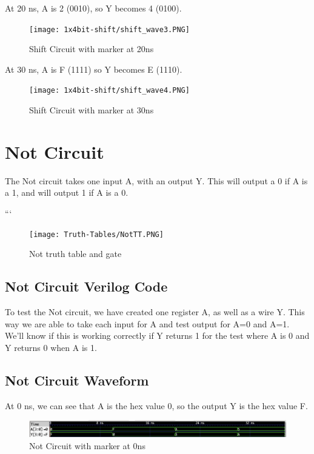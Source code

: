 \documentclass[12pt]{article}
\begin{document}
At 20 ns, A is 2 (0010), so Y becomes 4 (0100).
\begin{figure}[H]
    \centering
    \texttt{[image: 1x4bit-shift/shift\_wave3.PNG]}
    \caption{Shift Circuit with marker at 20ns}
    \label{fig:shift-wave3}
\end{figure}


At 30 ns, A is F (1111) so Y becomes E (1110).
\begin{figure}[H]
    \centering
    \texttt{[image: 1x4bit-shift/shift\_wave4.PNG]}
    \caption{Shift Circuit with marker at 30ns}
    \label{fig:shift-wave4}
\end{figure}

\section{Not Circuit}
The Not circuit takes one input A, with an output Y. This will output a 0 if A is a 1, and will output 1 if A is a 0.

```\begin{figure}[H]
    \centering
    \texttt{[image: Truth-Tables/NotTT.PNG]}
    \caption{Not truth table and gate}
    \label{fig:shift-table}
\end{figure}

\subsection{Not Circuit Verilog Code}


To test the Not circuit, we have created one register A, as well as a wire Y. This way we are able to take each input for A and test output for A=0 and A=1. We'll know if this is working correctly if Y returns 1 for the test where A is 0 and Y returns 0 when A is 1.


\subsection{Not Circuit Waveform}
At 0 ns, we can see that  A is the hex value 0, so the output Y is the hex value F.
\begin{figure}[H]
    \centering
    \includegraphics[width = 1.0\textwidth]{Step2/Not/Not-0ns.png}
    \caption{Not Circuit with marker at 0ns}
    \label{fig:enter-label}
\end{figure}
\end{document}
